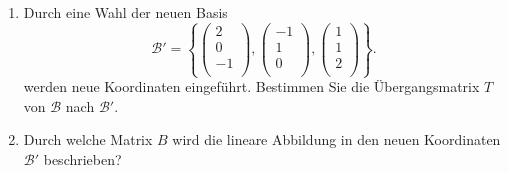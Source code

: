 \begin{enumerate}[label=\alph*)]
    \item Durch eine Wahl der neuen Basis
           \begin{equation*} 
                \mathcal{B}' = \left\{ 
                \begin{pmatrix}
                    2\\ 0\\ -1\\
                \end{pmatrix}, \begin{pmatrix}
                    -1\\ 1\\ 0\\
                \end{pmatrix}, \begin{pmatrix}
                    1\\ 1\\ 2\\
                \end{pmatrix}
                    \right\}.
            \end{equation*}
        werden neue Koordinaten eingeführt. Bestimmen Sie die Übergangsmatrix \( T \) von \( \mathcal{B}\) nach \( \mathcal{B}' \).
    \item Durch welche Matrix \( B \) wird die lineare Abbildung in den neuen Koordinaten \( \mathcal{B}'\) beschrieben?
\end{enumerate}

\vspace{1\baselineskip}

